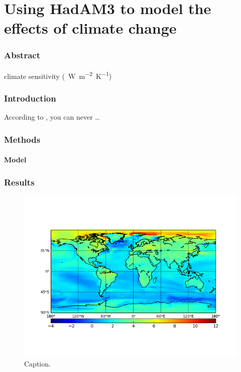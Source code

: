 \documentclass{article}
\begin{document}
\part*{Using HadAM3 to model the effects of climate change}

\section*{Abstract}

 climate sensitivity (\SI{}{W.m^{-2}.K^{-1}})

\section{Introduction}

According to \textcite{gregory2004new}, you can never \dots

\section{Methods}

\subsection{Model}

\section{Results}

\begin{figure}[hbp]
    \centering
    \includegraphics[width=\textwidth]{figures/figure_1}
    \caption{Caption.}
    \label{fig:figure_1}
\end{figure}
\end{document}

